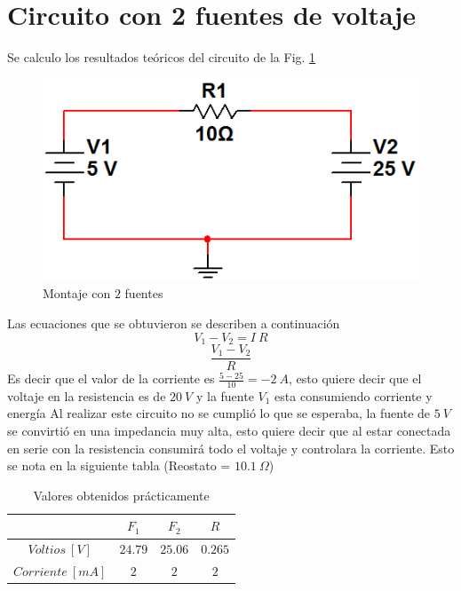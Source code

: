 \documentclass[twocolumn]{IEEEtran}
\begin{document}
\section{Circuito con 2 fuentes de voltaje}
\noindent
Se calculo los resultados teóricos del circuito de la Fig. \ref{fig4}
\begin{figure}[H]
	\centering
		\includegraphics[scale=0.5]{c3.png}
	\caption{Montaje con $2$ fuentes}
	\label{fig4}
\end{figure}
\noindent
Las ecuaciones que se obtuvieron se describen a continuación
\begin{equation}
{V_1} - {V_2} = I \ R
\end{equation}
\begin{equation}
 \frac{{V_1} - {V_2}}{R}
\end{equation}
\noindent
Es decir que el valor de la corriente es $\frac{5 - 25}{10} = -2\ A$, esto quiere decir que el voltaje en la resistencia es de $20\ V$ y la fuente $V_1$ esta consumiendo corriente y energía
\noindent
Al realizar este circuito no se cumplió lo que se esperaba, la fuente de $5 \ V$ se convirtió en una impedancia muy alta, esto quiere decir que al estar conectada en serie con la resistencia consumirá todo el voltaje y controlara la corriente. Esto se nota en la siguiente tabla (Reostato = $10.1 \ \Omega$)
\begin{table}[H]
	\centering
\begin{tabular}[c]{|c||c|c|c|} \hline
 & $F_{1}$ & $F_{2}$ & $R$ \\ \hline
$Voltios \ [V]$ & $24.79$ & $25.06$ & $0.265$ \\ \hline
$Corriente \ [mA]$ & $2$ & $2$ & $2$\\ \hline
\end{tabular}
	\caption{Valores obtenidos prácticamente}
	\label{tab8}
\end{table}
\end{document}
